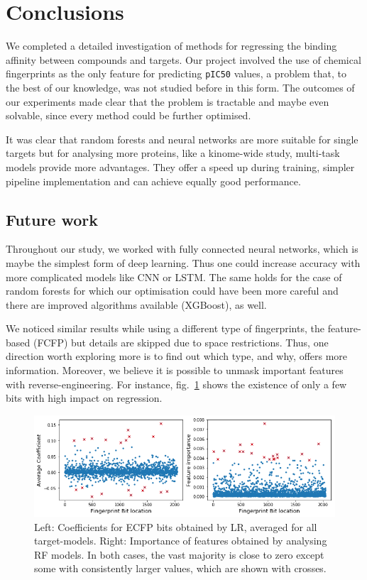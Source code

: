 \documentclass[10pt]{article}
\begin{document}
\section{Conclusions}
\label{ss:conclusions}

We completed a detailed investigation of methods for regressing the binding affinity between compounds and targets. Our project involved the use of chemical fingerprints as the only feature for predicting \texttt{pIC50} values, a problem that, to the best of our knowledge, was not studied before in this form. The outcomes of our experiments made clear that the problem is tractable and maybe even solvable, since every method could be further optimised.
 
It was clear that random forests and neural networks are more suitable for single targets but for analysing more proteins, like a kinome-wide study, multi-task models provide more advantages. They offer a speed up during training, simpler pipeline implementation and can achieve equally good performance.


\subsection{Future work}

Throughout our study, we worked with fully connected neural networks, which is maybe the simplest form of deep learning. Thus one could increase accuracy with more complicated models like CNN or LSTM. The same holds for the case of random forests for which our optimisation could have been more careful and there are improved algorithms available (XGBoost), as well.

We noticed similar results while using a different type of fingerprints, the feature-based (FCFP) but details are skipped due to space restrictions. Thus, one direction worth exploring more is to find out which type, and why, offers more information. Moreover, we believe it is possible to unmask important features with reverse-engineering. For instance, fig.~\ref{fig:features} shows the existence of only a few bits with high impact on regression. 
\begin{figure}[h]
    \includegraphics[width=\textwidth]{figs/FP-bits.png}
	\caption{{\small Left: Coefficients for ECFP bits obtained by LR, averaged for all target-models. Right: Importance of features obtained by analysing RF models. In both cases, the vast majority is close to zero except some with consistently larger values, which are shown with crosses.}}
	\label{fig:features}
\end{figure}
\end{document}
